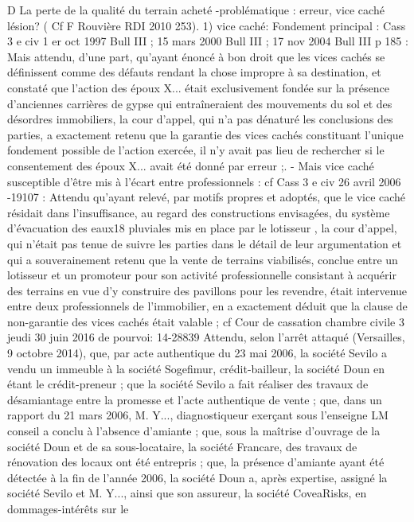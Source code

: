 \documentclass[11pt,a4paper]{report}
\begin{document}
	D La perte de la qualité du terrain acheté
	-problématique : erreur, vice caché lésion? ( Cf F Rouvière RDI 2010 253).
	1) vice caché:
	Fondement principal : Cass 3 e civ 1 er oct 1997 Bull III  ; 15 mars 2000 Bull III  ; 17 nov 2004
	Bull III  p 185 : Mais attendu, d'une part, qu'ayant énoncé à bon droit que les vices cachés se
	définissent comme des défauts rendant la chose impropre à sa destination, et constaté que l'action des époux
	X... était exclusivement fondée sur la présence d'anciennes carrières de gypse qui entraîneraient des
	mouvements du sol et des désordres immobiliers, la cour d'appel, qui n'a pas dénaturé les conclusions des
	parties, a exactement retenu que la garantie des vices cachés constituant l'unique fondement possible de
	l'action exercée, il n'y avait pas lieu de rechercher si le consentement des époux X... avait été donné par
	erreur ;.
	- Mais vice caché susceptible d’être mis à l’écart entre professionnels :
	cf Cass 3 e civ 26 avril 2006 -19107 : Attendu qu'ayant relevé, par motifs propres et adoptés, que le vice
	caché résidait dans l'insuffisance, au regard des constructions envisagées, du système d'évacuation des eaux18
	pluviales mis en place par le lotisseur , la cour d'appel, qui n'était pas tenue de suivre les parties dans le
	détail de leur argumentation et qui a souverainement retenu que la vente de terrains viabilisés, conclue
	entre un lotisseur et un promoteur pour son activité professionnelle consistant à acquérir des terrains en
	vue d'y construire des pavillons pour les revendre, était intervenue entre deux professionnels de
	l'immobilier, en a exactement déduit que la clause de non-garantie des vices cachés était valable ;
	cf Cour de cassation chambre civile 3 jeudi 30 juin 2016 \No  de pourvoi: 14-28839
	Attendu, selon l'arrêt attaqué (Versailles, 9 octobre 2014), que, par acte authentique du 23 mai 2006, la
	société Sevilo a vendu un immeuble à la société Sogefimur, crédit-bailleur, la société Doun en étant le
	crédit-preneur ; que la société Sevilo a fait réaliser des travaux de désamiantage entre la promesse et l'acte
	authentique de vente ; que, dans un rapport du 21 mars 2006, M. Y..., diagnostiqueur exerçant sous
	l'enseigne LM conseil a conclu à l'absence d'amiante ; que, sous la maîtrise d'ouvrage de la société Doun et
	de sa sous-locataire, la société Francare, des travaux de rénovation des locaux ont été entrepris ; que, la
	présence d'amiante ayant été détectée à la fin de l'année 2006, la société Doun a, après expertise, assigné la
	société Sevilo et M. Y..., ainsi que son assureur, la société CoveaRisks, en dommages-intérêts sur le
\end{document}
